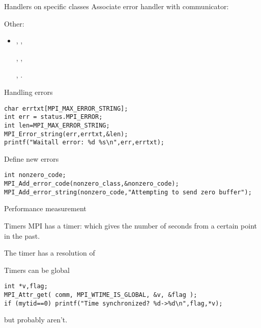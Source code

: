 \begin{numberedframe}{Handlers on specific classes}
Associate error handler with communicator:\\
   

  Other:
\begin{itemize}
\item  {},
  ,
\begin{mpifour}
  ,
  ,
\end{mpifour}
  ,
  .
\end{itemize}  
\end{numberedframe}

\begin{numberedframe}{Handling errors}
\begin{lstlisting}
char errtxt[MPI_MAX_ERROR_STRING];
int err = status.MPI_ERROR;
int len=MPI_MAX_ERROR_STRING;
MPI_Error_string(err,errtxt,&len);
printf("Waitall error: %d %s\n",err,errtxt);    
\end{lstlisting}
\end{numberedframe}

\begin{numberedframe}{Define new errors}
\begin{lstlisting}
int nonzero_code;
MPI_Add_error_code(nonzero_class,&nonzero_code);
MPI_Add_error_string(nonzero_code,"Attempting to send zero buffer");
\end{lstlisting}
\end{numberedframe}

 {Performance measurement}

\begin{numberedframe}{Timers}
  MPI has a  timer: 
  which gives the number of seconds from a certain point in the past.

  The timer has a resolution of 

  Timers can be global
\begin{lstlisting}
int *v,flag;
MPI_Attr_get( comm, MPI_WTIME_IS_GLOBAL, &v, &flag );
if (mytid==0) printf("Time synchronized? %d->%d\n",flag,*v);
\end{lstlisting}
  but probably aren't.
\end{numberedframe}

